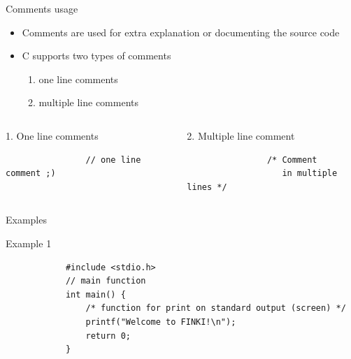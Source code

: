 \begin{frame}[fragile]{Comments usage}
    \begin{itemize}
        \item Comments are used for extra explanation or documenting the source code
        \item C supports two types of comments
        \begin{enumerate}
            \item one line comments
            \item multiple line comments
        \end{enumerate} 
        
    \end{itemize}
        
    \begin{columns}[t]
            \begin{block}{1. One line comments}
                \begin{verbatim}
                // one line comment ;)
                \end{verbatim}
            \end{block}
            \begin{block}{2. Multiple line comment}
                \begin{verbatim}
                /* Comment
                   in multiple lines */
                \end{verbatim}
            \end{block}
    \end{columns}       

\end{frame}

\begin{frame}[fragile]{Examples}
    \begin{exampleblock}{Example 1}
        \begin{lstlisting}
            #include <stdio.h>
            // main function
            int main() {
                /* function for print on standard output (screen) */
                printf("Welcome to FINKI!\n");
                return 0;
            }
        \end{lstlisting}
    \end{exampleblock}
\end{frame}

